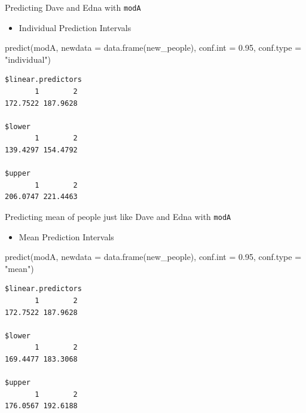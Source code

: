 \documentclass[
  ignorenonframetext,
]{beamer}
\newenvironment{Shaded}{\begin{snugshade}}{\end{snugshade}}
\newcommand{\AttributeTok}[1]{\textcolor[rgb]{0.77,0.63,0.00}{#1}}
\newcommand{\FloatTok}[1]{\textcolor[rgb]{0.00,0.00,0.81}{#1}}
\newcommand{\FunctionTok}[1]{\textcolor[rgb]{0.00,0.00,0.00}{#1}}
\newcommand{\NormalTok}[1]{#1}
\newcommand{\StringTok}[1]{\textcolor[rgb]{0.31,0.60,0.02}{#1}}
\providecommand{\tightlist}{%
  \setlength{\itemsep}{0pt}\setlength{\parskip}{0pt}}
\begin{document}
\begin{frame}[fragile]{Predicting Dave and Edna with \texttt{modA}}
\protect\hypertarget{predicting-dave-and-edna-with-moda}{}
\begin{itemize}
\tightlist
\item
  Individual Prediction Intervals
\end{itemize}

\begin{Shaded}
\begin{Highlighting}[]
\FunctionTok{predict}\NormalTok{(modA, }\AttributeTok{newdata =} \FunctionTok{data.frame}\NormalTok{(new\_people), }
        \AttributeTok{conf.int =} \FloatTok{0.95}\NormalTok{, }\AttributeTok{conf.type =} \StringTok{"individual"}\NormalTok{)}
\end{Highlighting}
\end{Shaded}

\begin{verbatim}
$linear.predictors
       1        2 
172.7522 187.9628 

$lower
       1        2 
139.4297 154.4792 

$upper
       1        2 
206.0747 221.4463 
\end{verbatim}
\end{frame}

\begin{frame}[fragile]{Predicting mean of people just like Dave and Edna
with \texttt{modA}}
\protect\hypertarget{predicting-mean-of-people-just-like-dave-and-edna-with-moda}{}
\begin{itemize}
\tightlist
\item
  Mean Prediction Intervals
\end{itemize}

\begin{Shaded}
\begin{Highlighting}[]
\FunctionTok{predict}\NormalTok{(modA, }\AttributeTok{newdata =} \FunctionTok{data.frame}\NormalTok{(new\_people), }
        \AttributeTok{conf.int =} \FloatTok{0.95}\NormalTok{, }\AttributeTok{conf.type =} \StringTok{"mean"}\NormalTok{)}
\end{Highlighting}
\end{Shaded}

\begin{verbatim}
$linear.predictors
       1        2 
172.7522 187.9628 

$lower
       1        2 
169.4477 183.3068 

$upper
       1        2 
176.0567 192.6188 
\end{verbatim}
\end{frame}
\end{document}
